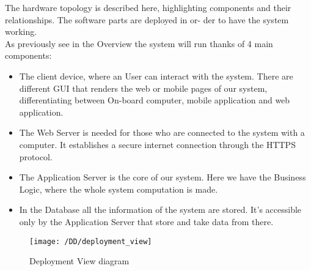 The hardware topology is described here, highlighting components and their relationships. The software parts are deployed in or-
der to have the system working.
\\As previously see in the Overview the system will run thanks of 4 main components:
\begin{itemize}
	\item{The client device, where an User can interact with the system. There are different GUI that renders the web or mobile pages of our system, differentiating between On-board computer, mobile application and web application.}
	\item{ The Web Server is needed for those who are connected to the system with a computer. It establishes a secure internet connection through the HTTPS protocol.}
	\item{The Application Server is the core of our system. Here we have the Business Logic, where the whole system computation is
made.}
	\item{In the Database all the information of the system are stored. It's accessible only by the Application Server that store and take data from there.}
\end{itemize} 

\newpage
\begin{figure}[!ht]
  \centering
  \vspace{0.1cm}
  \texttt{[image: /DD/deployment\_view]}\\
  \vspace{0.1cm}
  \caption{Deployment View diagram} 
  \label{fig:DeploymentView} 
\end{figure}
